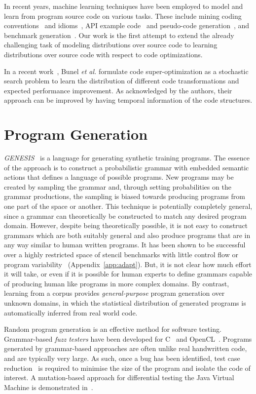 In recent years, machine learning techniques have been employed to model and learn from program source code on various tasks. These include mining coding conventions~\cite{Allamanis2014a} and idioms~\cite{Allamanis2014}, API example code~\cite{Zhang2015a} and pseudo-code generation~\cite{Oda2015}, and benchmark generation~\cite{Cummins2017a}. Our work is the first attempt to extend the already challenging task of modeling distributions over source code to learning distributions over source code with respect to code optimizations.

In a recent work~\cite{Bunel2017a}, Bunel \emph{et al.} formulate code super-optimization as a stochastic search problem to learn the distribution of different code transformations and expected performance improvement. As acknowledged by the authors, their approach can be improved by having temporal information of the code structures.


\section{Program Generation}

\emph{GENESIS}~\cite{Chiu2015} is a language for generating synthetic training programs. The essence of the approach is to construct a probabilistic grammar with embedded semantic actions that defines a language of possible programs. New programs may be created by sampling the grammar and, through setting probabilities on the grammar productions, the sampling is biased towards producing programs from one part of the space or another. This technique is potentially completely general, since a grammar can theoretically be constructed to match any desired program domain. However, despite being theoretically possible, it is not easy to construct grammars which are both suitably general and also produce programs that are in any way similar to human written programs. It has been shown to be successful over a highly restricted space of stencil benchmarks with little control flow or program variability~\cite{Garvey2015b,Falch2015} (Appendix~\ref{app:adapt}). But, it is not clear how much effort it will take, or even if it is possible for human experts to define grammars capable of producing human like programs in more complex domains. By contrast, learning from a corpus provides \emph{general-purpose} program generation over unknown domains, in which the statistical distribution of generated programs is automatically inferred from real world code.

Random program generation is an effective method for software testing. Grammar-based \emph{fuzz testers} have been developed for C~\cite{Yang2012} and OpenCL~\cite{Lidbury2015a}. Programs generated by grammar-based approaches are often  unlike real handwritten code, and are typically very large. As such, once a bug has been identified, test case reduction~\cite{Regehr2012a} is required to minimise the size of the program and isolate the code of interest. A mutation-based approach for differential testing the Java Virtual Machine is demonstrated in~\cite{Chena}.

